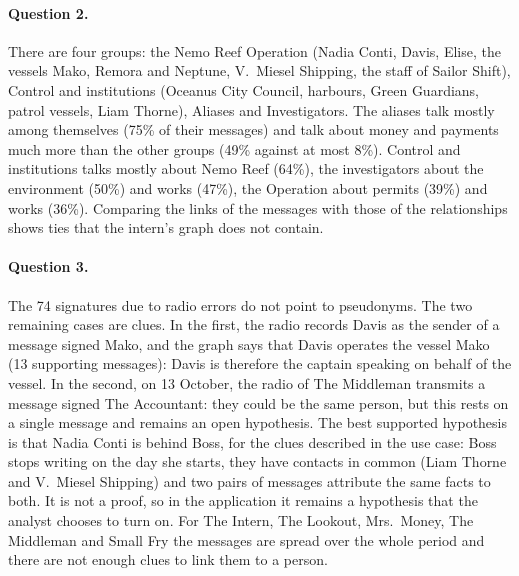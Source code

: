 \documentclass[11pt,a4paper]{article}
\begin{document}
\paragraph{Question 2.} There are four groups: the Nemo Reef Operation (Nadia Conti, Davis, Elise, the vessels Mako,
Remora and Neptune, V.\ Miesel Shipping, the staff of Sailor Shift), Control and institutions (Oceanus City Council,
harbours, Green Guardians, patrol vessels, Liam Thorne), Aliases and Investigators. The aliases talk mostly among
themselves (75\% of their messages) and talk about money and payments much more than the other groups (49\% against at
most 8\%). Control and institutions talks mostly about Nemo Reef (64\%), the investigators about the environment (50\%)
and works (47\%), the Operation about permits (39\%) and works (36\%). Comparing the links of the messages with those of
the relationships shows ties that the intern's graph does not contain.

\paragraph{Question 3.}\label{sec:q3} The 74 signatures due to radio errors do not point to pseudonyms. The two
remaining cases are clues. In the first, the radio records Davis as the sender of a message signed Mako, and the graph
says that Davis operates the vessel Mako (13 supporting messages): Davis is therefore the captain speaking on behalf of
the vessel. In the second, on 13 October, the radio of The Middleman transmits a message signed The Accountant: they
could be the same person, but this rests on a single message and remains an open hypothesis. The best supported
hypothesis is that Nadia Conti is behind Boss, for the clues described in the use case: Boss stops writing on the day
she starts, they have contacts in common (Liam Thorne and V.\ Miesel Shipping) and two pairs of messages attribute the
same facts to both. It is not a proof, so in the application it remains a hypothesis that the analyst chooses to turn
on. For The Intern, The Lookout, Mrs.\ Money, The Middleman and Small Fry the messages are spread over the whole period and there
are not enough clues to link them to a person.
\end{document}
